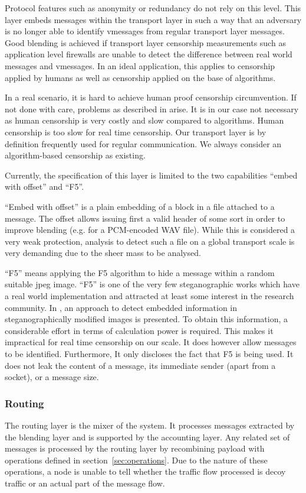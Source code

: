 \documentclass[9pt,journal,compsoc]{IEEEtran}
\begin{document}
Protocol features such as anonymity or redundancy do not rely on this level. This layer embeds messages within the transport layer in such a way that an adversary is no longer able to identify vmessages from regular transport layer messages. Good blending is achieved if transport layer censorship measurements such as application level firewalls are unable to detect the difference between real world messages and vmessages. In an ideal application, this applies to censorship applied by humans as well as censorship applied on the base of algorithms. 

In a real scenario, it is hard to achieve human proof censorship circumvention. If not done with care, problems as described in \cite{abadi2005moderately} arise. It is in our case not necessary as human censorship is very costly and slow compared to algorithms. Human censorship is too slow for real time censorship. Our transport layer is by definition frequently used for regular communication. We always consider an algorithm-based censorship as existing.

Currently, the specification of this layer is limited to the two capabilities ``embed with offset'' and ``F5''. 

``Embed with offset'' is a plain embedding of a block in a file attached to a message. The offset allows issuing first a valid header of some sort in order to improve blending (e.g. for a PCM-encoded WAV file). While this is considered a very weak protection, analysis to detect such a file on a global transport scale is very demanding due to the sheer mass to be analysed. 

``F5'' means applying the F5 algorithm to hide a message within a random suitable jpeg image. ``F5'' is one of the very few steganographic works which have a real world implementation and attracted at least some interest in the research community. In \cite{steganalysisf5}, an approach to detect embedded information in steganographically modified images is presented. To obtain this information, a considerable effort in terms of calculation power is required. This makes it impractical for real time censorship on our scale. It does however allow messages to be identified. Furthermore, It only discloses the fact that F5 is being used. It does not leak the content of a message, its immediate sender (apart from a socket), or a message size.

\subsubsection{Routing}
The routing layer is the mixer of the system. It processes messages extracted by the blending layer and is supported by the accounting layer. Any related set of messages is processed by the routing layer by recombining payload with operations defined in section~\ref{sec:operations}. Due to the nature of these operations, a node is unable to tell whether the traffic flow processed is decoy traffic or an actual part of the message flow.
\end{document}
